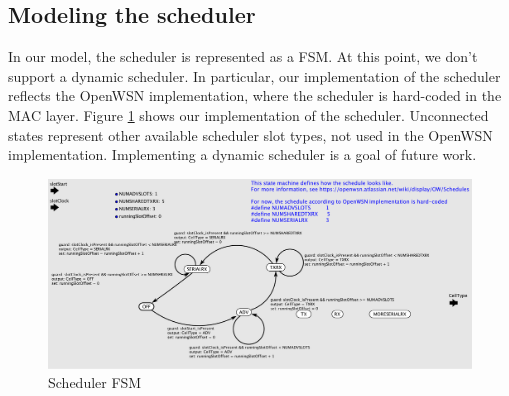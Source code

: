 \subsection{Modeling the scheduler}
\label{sec:modeling-scheduler}
In our model, the scheduler is represented as a FSM. At this point, we don't support a dynamic scheduler. In particular, our implementation of the scheduler reflects the OpenWSN implementation, where the scheduler is hard-coded in the MAC layer. Figure \ref{fig:scheduler} shows our implementation of the scheduler. Unconnected states represent other available scheduler slot types, not used in the OpenWSN implementation. Implementing a dynamic scheduler is a goal of future work.

\begin{figure}
  \centering
  \includegraphics[width=\textwidth]{figures/Scheduler.pdf}
  \caption{Scheduler FSM}
  \label{fig:scheduler}
\end{figure}

